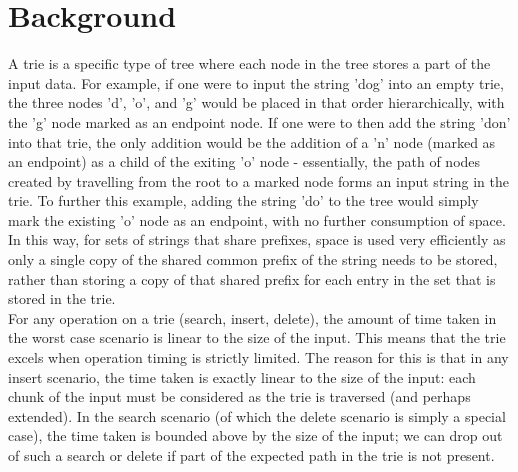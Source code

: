 \documentclass{llncs}
\begin{document}
\section{Background}
A trie is a specific type of tree where each node in the tree stores a part of the input data. For example, if one were to input the string 'dog' into an empty trie, the three nodes 'd', 'o', and 'g' would be placed in that order hierarchically, with the 'g' node marked as an endpoint node. If one were to then add the string 'don' into that trie, the only addition would be the addition of a 'n' node (marked as an endpoint) as a child of the exiting 'o' node - essentially, the path of nodes created by travelling from the root to a marked node forms an input string in the trie. To further this example, adding the string 'do' to the tree would simply mark the existing 'o' node as an endpoint, with no further consumption of space. In this way, for sets of strings that share prefixes, space is used very efficiently as only a single copy of the shared common prefix of the string needs to be stored, rather than storing a copy of that shared prefix for each entry in the set that is stored in the trie. \\ %
For any operation on a trie (search, insert, delete), the amount of time taken in the worst case scenario is linear to the size of the input. This means that the trie excels when operation timing is strictly limited. The reason for this is that in any insert scenario, the time taken is exactly linear to the size of the input: each chunk of the input must be considered as the trie is traversed (and perhaps extended). In the search scenario (of which the delete scenario is simply a special case), the time taken is bounded above by the size of the input; we can drop out of such a search or delete if part of the expected path in the trie is not present. \\
\newpage
\end{document}
